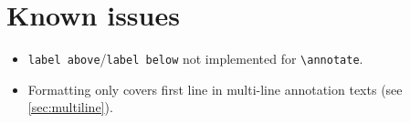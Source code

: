 \documentclass{article}
\begin{document}
\section{Known issues}

\begin{itemize}
    \item \texttt{label above}/\texttt{label below} not implemented for \verb|\annotate|.

    \item Formatting only covers first line in multi-line annotation texts (see \cref{sec:multiline}).
\end{itemize}
\end{document}
